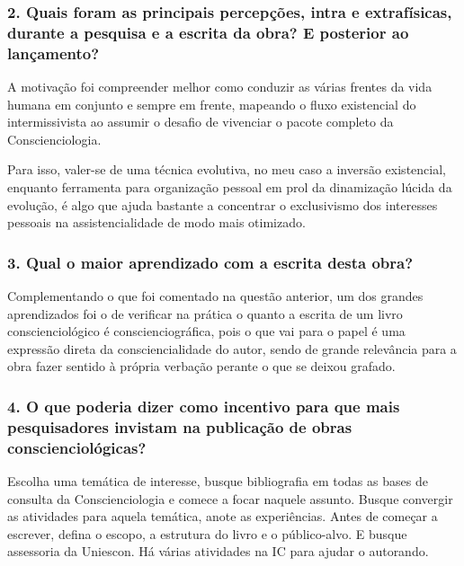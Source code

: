 \documentclass{gescons}
\begin{document}
\begin{multicols}{2}
\subsubsection{2.       Quais foram as principais percepções, intra e extrafísicas, durante a pesquisa e a escrita da obra? E posterior ao lançamento?}

A motivação foi compreender melhor como conduzir as várias frentes da vida humana em conjunto e sempre em frente, mapeando o fluxo existencial do intermissivista ao assumir o desafio de vivenciar o pacote completo da Conscienciologia.

Para isso, valer-se de uma técnica evolutiva, no meu caso a inversão existencial, enquanto ferramenta para organização pessoal em prol da dinamização lúcida da evolução, é algo que ajuda bastante a concentrar o exclusivismo dos interesses pessoais na assistencialidade de modo mais otimizado.



\subsubsection{3.       Qual o maior aprendizado com a escrita desta obra?}

Complementando o que foi comentado na questão anterior, um dos grandes aprendizados foi o de verificar na prática o quanto a escrita de um livro conscienciológico é conscienciográfica, pois o que vai para o papel é uma expressão direta da consciencialidade do autor, sendo de grande relevância para a obra fazer sentido à própria verbação perante o que se deixou grafado.


\subsubsection{4.       O que poderia dizer como incentivo para que mais pesquisadores invistam na publicação de obras conscienciológicas?}

Escolha uma temática de interesse, busque bibliografia em todas as bases de consulta da Conscienciologia e comece a focar naquele assunto. Busque convergir as atividades para aquela temática, anote as experiências. Antes de começar a escrever, defina o escopo, a estrutura do livro e o público-alvo. E busque assessoria da Uniescon. Há várias atividades na IC para ajudar o autorando. 
    

\end{multicols}
\end{document}
